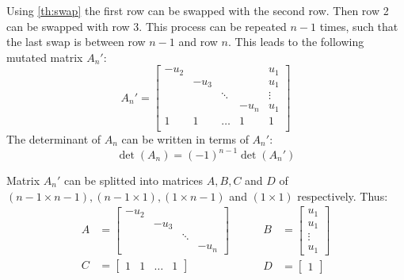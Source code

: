Using \autoref{th:swap} the first row can be swapped with the second row. Then row 2 can be swapped with row 3. This process can be repeated $n-1$ times, such that the last swap is between row $n-1$ and row $n$. This leads to the following mutated matrix $A_n'$:
\begin{equation}
    A_n' = 
\begin{bmatrix}
    -u_2 &      &        &      & u_1\\
         & -u_3 &        &      & u_1\\
         &      & \ddots &      & \vdots\\
         &      &        & -u_n & u_1 \\
    1    & 1    & \dots  & 1    & 1 \\
\end{bmatrix}
\end{equation}
The determinant of $A_n$ can be written in terms of $A_n'$:
\begin{equation} \label{eq:3}
    \det(A_n) = (-1)^{n-1} \det(A_n')
\end{equation}

Matrix $A_n'$ can be splitted into matrices $A, B, C$ and $D$ of $(n-1 \times n-1), (n-1 \times 1), (1 \times n-1)$ and $(1 \times 1)$ respectively. Thus:
\begin{equation}
\begin{split}
A &= \begin{bmatrix}
    -u_2 &      &        &      \\
         & -u_3 &        &      \\
         &      & \ddots &      \\
         &      &        & -u_n
    \end{bmatrix}\\
C &= \begin{bmatrix}1 & 1 & \dots & 1\end{bmatrix}
\end{split}\quad~\quad
\begin{split}
B &= \begin{bmatrix}u_1 \\ u_1 \\ \vdots \\ u_1\end{bmatrix}\\
D &= \begin{bmatrix}1\end{bmatrix}
\end{split}
\end{equation}


